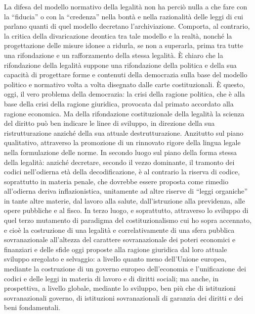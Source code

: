 La difesa del modello normativo della legalità non ha perciò nulla a che fare con la “fiducia” o con la “credenza” nella bontà e nella razionalità delle leggi di cui parlano quanti di quel modello decretano l’archiviazione. Comporta, al contrario, la critica della divaricazione deontica tra tale modello e la realtà, nonché la progettazione delle misure idonee a ridurla, se non a superarla, prima tra tutte una rifondazione e un rafforzamento della stessa legalità. È chiaro che la rifondazione della legalità suppone una rifondazione della politica e della sua capacità di progettare forme e contenuti della democrazia sulla base del modello politico e normativo volta a volta disegnato dalle carte costituzionali. È questo, oggi, il vero problema della democrazia: la crisi della ragione politica, che è alla base della crisi della ragione giuridica, provocata dal primato accordato alla ragione economica. Ma della rifondazione costituzionale della legalità la scienza del diritto può ben indicare le linee di sviluppo, in direzione della sua ristrutturazione anziché della sua attuale destrutturazione. Anzitutto sul piano qualitativo, attraverso la promozione di un rinnovato rigore della lingua legale nella formulazione delle norme. In secondo luogo sul piano della forma stessa della legalità: anziché decretare, secondo il vezzo dominante, il tramonto dei codici nell’odierna età della decodificazione, è al contrario la riserva di codice, soprattutto in materia penale, che dovrebbe essere proposta come rimedio all’odierna deriva inflazionistica, unitamente ad altre riserve di “leggi organiche” in tante altre materie, dal lavoro alla salute, dall’istruzione alla previdenza, alle opere pubbliche e al fisco. In terzo luogo, e soprattutto, attraverso lo sviluppo di quel terzo mutamento di paradigma del costituzionalismo cui ho sopra accennato, e cioè la costruzione di una legalità e correlativamente di una sfera pubblica sovranazionale all’altezza del carattere sovranazionale dei poteri economici e finanziari e delle sfide oggi proposte alla ragione giuridica dal loro attuale sviluppo sregolato e selvaggio: a livello quanto meno dell’Unione europea, mediante la costruzione di un governo europeo dell’economia e l’unificazione dei codici e delle leggi in materia di lavoro e di diritti sociali; ma anche, in prospettiva, a livello globale, mediante lo sviluppo, ben più che di istituzioni sovranazionali governo, di istituzioni sovranazionali di garanzia dei diritti e dei beni fondamentali.
